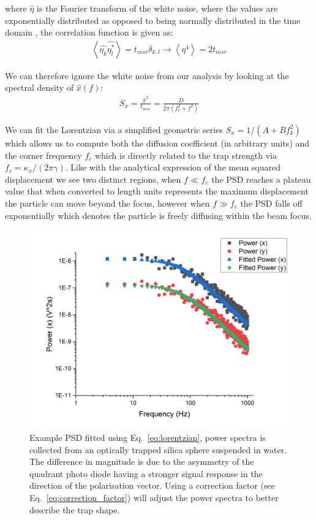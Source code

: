 where $\hat{\eta}$ is the Fourier transform of the white noise, 
where the values are exponentially distributed as opposed to being 
normally distributed in the time domain \cite{BergSoerensen2004}, 
the correlation function is given as:
\begin{align}
	\left<\hat{\eta_k}\hat{\eta_l^*}\right> = t_{msr} \delta_{k,l} \rightarrow \left< \eta^4 \right> = 2t_{msr}
\end{align} 

We can therefore ignore the white noise from our analysis by looking 
at the spectral density of $\hat{x}(f)$: 
\begin{align}
	\label{eq:lorentzian}
	S_x = \frac{\hat{x}^2}{t_{msr}} = \frac{D}{2\pi(f_c^2+f^2)}
\end{align}

We can fit the Lorentzian via a simplified geometric series 
$S_x = 1/(A+Bf_k^2)$ which allows us to compute both the diffusion 
coefficient (in arbitrary units) and the corner frequency $f_c$ 
which is directly related to the trap strength via 
$f_c = \kappa_x/(2\pi\gamma)$. Like with the analytical expression 
of the mean squared displacement we see two distinct regions, when 
$f\ll f_c$ the PSD reaches a plateau value that when converted to 
length units represents the maximum displacement the particle can 
move beyond the focus, however when $f\gg f_c$ the PSD falls off 
exponentially which denotes the particle is freely diffusing within 
the beam focus.
\begin{figure}[t]
	\centering
	\includegraphics[width=\linewidth]{PSD.png}
	\caption{Example PSD fitted using Eq.~\ref{eq:lorentzian}, power spectra is collected from an optically trapped silica sphere suspended in water. The difference in magnitude is due to the asymmetry of the quadrant photo diode having a stronger signal response in the direction of the polarisation vector. Using a correction factor (see Eq.~\ref{eq:correction_factor}) will adjust the power spectra to better describe the trap shape.}
\end{figure}

